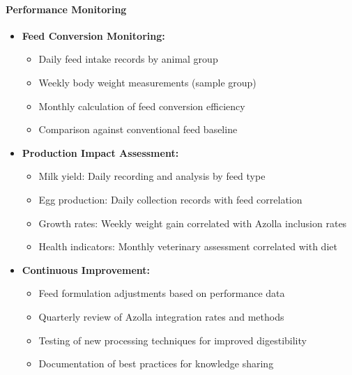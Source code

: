 \paragraph{Performance Monitoring}
\begin{itemize}
    \item \textbf{Feed Conversion Monitoring:}
    \begin{itemize}
        \item Daily feed intake records by animal group
        \item Weekly body weight measurements (sample group)
        \item Monthly calculation of feed conversion efficiency
        \item Comparison against conventional feed baseline
    \end{itemize}
    \item \textbf{Production Impact Assessment:}
    \begin{itemize}
        \item Milk yield: Daily recording and analysis by feed type
        \item Egg production: Daily collection records with feed correlation
        \item Growth rates: Weekly weight gain correlated with Azolla inclusion rates
        \item Health indicators: Monthly veterinary assessment correlated with diet
    \end{itemize}
    \item \textbf{Continuous Improvement:}
    \begin{itemize}
        \item Feed formulation adjustments based on performance data
        \item Quarterly review of Azolla integration rates and methods
        \item Testing of new processing techniques for improved digestibility
        \item Documentation of best practices for knowledge sharing
    \end{itemize}
\end{itemize}


